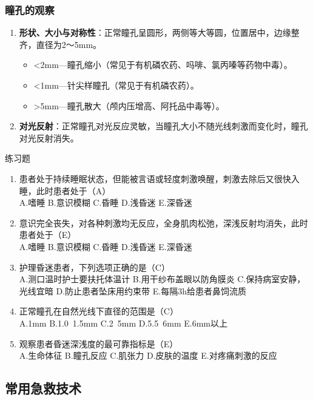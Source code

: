 \documentclass[11pt, a4paper]{ctexart}
\begin{document}
\subsubsection{瞳孔的观察}
\begin{enumerate}
    \item \textbf{形状、大小与对称性}：正常瞳孔呈圆形，两侧等大等圆，位置居中，边缘整齐，直径为2～5mm。
    \begin{itemize}
        \item <2mm—瞳孔缩小（常见于有机磷农药、吗啡、氯丙嗪等药物中毒）。
        \item <1mm—针尖样瞳孔（常见于有机磷农药）。
        \item >5mm—瞳孔散大（颅内压增高、阿托品中毒等）。
    \end{itemize}
    \item \textbf{对光反射}：正常瞳孔对光反应灵敏，当瞳孔大小不随光线刺激而变化时，瞳孔对光反射消失。
\end{enumerate}

\begin{examplebox}{练习题}
\begin{enumerate}
    \item 患者处于持续睡眠状态，但能被言语或轻度刺激唤醒，刺激去除后又很快入睡，此时患者处于（A）\\
    A.嗜睡 \quad B.意识模糊 \quad C.昏睡 \quad D.浅昏迷 \quad E.深昏迷
    \item 意识完全丧失，对各种刺激均无反应，全身肌肉松弛，深浅反射均消失，此时患者处于（E）\\
    A.嗜睡 \quad B.意识模糊 \quad C.昏睡 \quad D.浅昏迷 \quad E.深昏迷
    \item 护理昏迷患者，下列选项正确的是（C）\\
    A.测口温时护士要扶托体温计 \quad B.用干纱布盖眼以防角膜炎 \quad C.保持病室安静，光线宜暗 \quad D.防止患者坠床用约束带 \quad E.每隔3h给患者鼻饲流质
    \item 正常瞳孔在自然光线下直径的范围是（C）\\
    A.1mm \quad B.1.0~1.5mm \quad C.2~5mm \quad D.5.5~6mm \quad E.6mm以上
    \item 观察患者昏迷深浅度的最可靠指标是（E）\\
    A.生命体征 \quad B.瞳孔反应 \quad C.肌张力 \quad D.皮肤的温度 \quad E.对疼痛刺激的反应
\end{enumerate}
\end{examplebox}

\subsection{常用急救技术}
\end{document}

